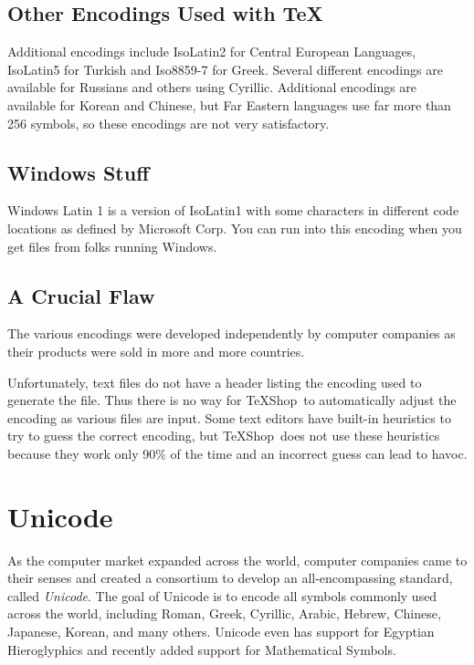 \documentclass[letterpaper,11pt]{article}
\newcommand{\TS}{\textsf{\TeX Shop}}
\newcommand{\acr}[1]{\textsf{#1}}
\begin{document}
\subsection{Other Encodings Used with \TeX}

Additional encodings include \acr{IsoLatin2} for Central European Languages, \acr{IsoLatin5} for 
\acr{Turkish} and \acr{Iso8859-7} for Greek. Several different encodings are available for Russians and others using Cyrillic. Additional encodings are available for Korean and Chinese, but Far Eastern languages use far more than 256 symbols, so these encodings are not very satisfactory.

\subsection{Windows Stuff}

\acr{Windows Latin 1} is a version of \acr{IsoLatin1} with some characters in different code locations as defined by Microsoft Corp. You can run into this encoding when you get files from folks running Windows.

\subsection{A Crucial Flaw}
The various encodings were developed independently by  computer companies as
their products were sold in more and more countries. 

Unfortunately, text files do not have a header listing the encoding used to generate the
file. Thus there is no way for \TS\ to automatically adjust the encoding as various files are input. 
Some text editors have built-in heuristics to try to guess the correct encoding, but \TS\ does not use these heuristics because they work only 90\% of the time and an incorrect guess can lead to havoc.

\section{Unicode}

As the computer market expanded across the world, computer companies came to their senses and created a consortium to develop an all-encompassing standard, called {\em Unicode}. The goal of Unicode is to encode all symbols commonly used across the world, including Roman, Greek, Cyrillic, Arabic, Hebrew, Chinese, Japanese, Korean, and many others. Unicode even has support for
Egyptian Hieroglyphics and recently added support for Mathematical Symbols.
\end{document}
